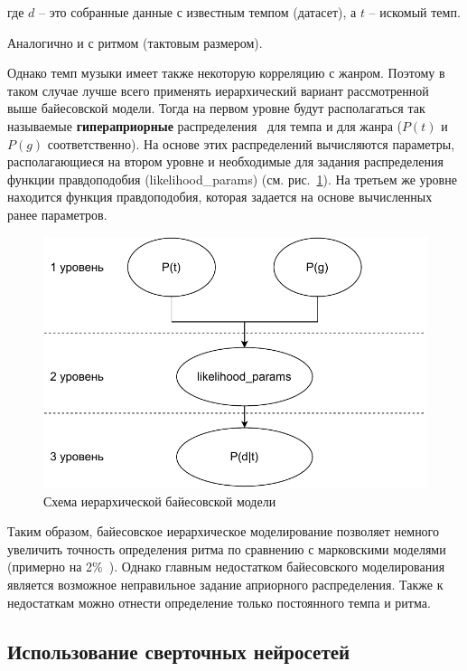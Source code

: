 где $d$ -- это собранные данные с известным темпом (датасет), а $t$ -- искомый темп.

Аналогично и с ритмом (тактовым размером).

Однако темп музыки имеет также некоторую корреляцию с жанром. Поэтому в таком случае лучше всего применять иерархический вариант рассмотренной выше байесовской модели. Тогда на первом уровне будут располагаться так называемые \textbf{гипераприорные} распределения~\cite{kubler_pymc3} для темпа и для жанра ($P(t)$ и $P(g)$ соответственно). На основе этих распределений вычисляются параметры, располагающиеся на втором уровне и необходимые для задания распределения функции правдоподобия (likelihood\_params) (см. рис.~\ref{img:hbm}). На третьем же уровне находится функция правдоподобия, которая задается на основе вычисленных ранее параметров.

\begin{figure}[h]
	\centering
	\includegraphics[scale=0.9]{svg/hierarchical.pdf}
	\caption{Схема иерархической байесовской модели}
	\label{img:hbm}
\end{figure}

Таким образом, байесовское иерархическое моделирование позволяет немного увеличить точность определения ритма по сравнению с марковскими моделями (примерно на 2\%~\cite{bayesian}). Однако главным недостатком байесовского моделирования является возможное неправильное задание априорного распределения. Также к недостаткам можно отнести определение только постоянного темпа и ритма.

\subsection{Использование сверточных нейросетей}

